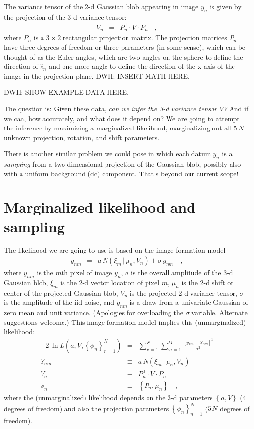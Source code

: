 \documentclass[12pt]{article}
\newcommand{\normal}{N}
\newcommand{\unitvec}[1]{\hat{#1}}
\newcommand{\zhat}{\unitvec{z}}
\newcommand{\transpose}{^{\mathsf{T}}}
\newcommand{\given}{\,|\,}
\newcommand{\like}{L}
\newcommand{\setof}[1]{\left\{{#1}\right\}}
\begin{document}
The variance tensor of the 2-d Gaussian blob appearing in image $y_n$
is given by the projection of the 3-d variance tensor:
\begin{eqnarray}
  V_n &=& P_n\transpose\cdot V\cdot P_n
  \quad ,
\end{eqnarray}
where $P_n$ is a $3\times 2$ rectangular projection matrix.
The projection matrices $P_n$ have three degrees of freedom or three
parameters (in some sense), which can be thought of as the Euler
angles, which are two angles on the sphere to define the direction of
$\zhat_n$ and one more angle to define the direction of the x-axis of
the image in the projection plane.
DWH: INSERT MATH HERE.

DWH: SHOW EXAMPLE DATA HERE.

The question is:
Given these data, \emph{can we infer the 3-d variance tensor $V$?}
And if we can, how accurately, and what does it depend on?
We are going to attempt the inference by maximizing a marginalized
likelihood, marginalizing out all $5\,N$ unknown projection, rotation,
and shift parameters.

There is another similar problem we could pose in which each datum
$y_n$ is a \emph{sampling} from a two-dimensional projection of the
Gaussian blob, possibly also with a uniform background (dc) component.
That's beyond our current scope!

\section{Marginalized likelihood and sampling}

The likelihood we are going to use is based on the image formation
model
\begin{eqnarray}
  y_{nm} &=& a\,\normal(\xi_m\given\mu_n,V_n) + \sigma\,g_{nm}
  \quad,
\end{eqnarray}
where $y_{nm}$ is the $m$th pixel of image $y_n$,
$a$ is the overall amplitude of the 3-d Gaussian blob,
$\xi_m$ is the 2-d vector location of pixel $m$,
$\mu_n$ is the 2-d shift or center of the projected Gaussian blob,
$V_n$ is the projected 2-d variance tensor,
$\sigma$ is the amplitude of the iid noise,
and $g_{nm}$ is a draw from a univariate Gaussian of zero mean and unit variance.
(Apologies for overloading the $\sigma$ variable.
Alternate suggestions welcome.)
This image formation model implies this (unmarginalized) likelihood:
\begin{eqnarray}
  -2\,\ln\like(a,V,\setof{\phi_n}_{n=1}^N) &=& \sum_{n=1}^N \sum_{m=1}^M \frac{[y_{nm} - Y_{nm}]^2}{\sigma^2}
  \\
  Y_{nm} &\equiv& a\,\normal(\xi_m\given\mu_n,V_n)
  \\
  V_n &\equiv& P_n\transpose\cdot V\cdot P_n
  \\
  \phi_n &\equiv& \setof{P_n, \mu_n}
  \quad,
\end{eqnarray}
where the (unmarginalized) likelihood depends on the 3-d parameters
$\setof{a,V}$ (4 degrees of freedom) and also the projection
parameters $\setof{\phi_n}_{n=1}^N$ ($5\,N$ degrees of freedom).
\end{document}
